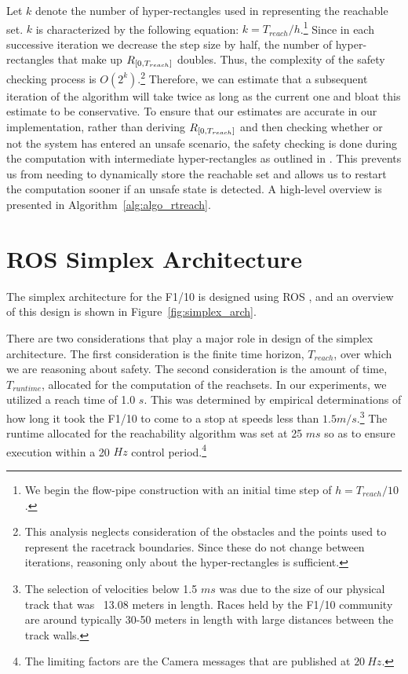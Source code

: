 \documentclass[manuscript,screen,review]{acmart}
\newcommand{\todo}[1]{\textcolor{red}{\textbf{\underline{TODO:}} #1}}
\newcommand{\figref}[1]{Figure~\ref{#1}}
\begin{document}
Let $k$ denote the number of hyper-rectangles used in representing the reachable set. $k$ is characterized by the following equation: $k = T_{reach} / h$.\footnote{We begin the flow-pipe construction with an initial time step of $h = T_{reach}/10$.} Since in each successive iteration we decrease the step size by half, the number of hyper-rectangles that make up $\mathnormal{R}_{[0,T_{reach}]}$ doubles. Thus, the complexity of the safety checking process is $O(2^k)$.\footnote{This analysis neglects consideration of the obstacles and the points used to represent the racetrack boundaries. Since these do not change between iterations, reasoning only about the hyper-rectangles is sufficient.} Therefore, we can estimate that a subsequent iteration of the algorithm will take twice as long as the current one and bloat this estimate to be conservative. To ensure that our estimates are accurate in our implementation, rather than deriving $\mathnormal{R}_{[0,T_{reach}]}$ and then checking whether or not the system has entered an unsafe scenario, the safety checking is done during the computation with intermediate hyper-rectangles as outlined in \cite{Bak2014}. This prevents us from needing to dynamically store the reachable set and allows us to restart the computation sooner if an unsafe state is detected. A high-level overview is presented in Algorithm~\ref{alg:algo_rtreach}.%







\section{ROS Simplex Architecture}

\label{section:simplex}
The simplex architecture for the F1/10 is designed using ROS \cite{ROS}, and an overview of this design is shown in \figref{fig:simplex_arch}. 

There are two considerations that play a major role in design of the simplex architecture. The first consideration is the finite time horizon, $T_{reach}$, over which we are reasoning about safety. The second consideration is the amount of time, $T_{runtime}$, allocated for the computation of the reachsets. In our experiments, we utilized a reach time of 1.0 $s$. This was determined by empirical determinations of how long it took the F1/10 to come to a stop at speeds less than $1.5 m/s.$\footnote{The selection of velocities below 1.5 $ms$ was due to the size of our physical track that was ~13.08 meters in length. Races held by the F1/10 community are around typically 30-50 meters in length with large distances between the track walls.} The runtime allocated for the reachability algorithm was set at 25 $ms$ so as to ensure execution within a 20 $Hz$ control period.\footnote{The limiting factors are the Camera messages that are published at $20 \ Hz$.}  
\end{document}
